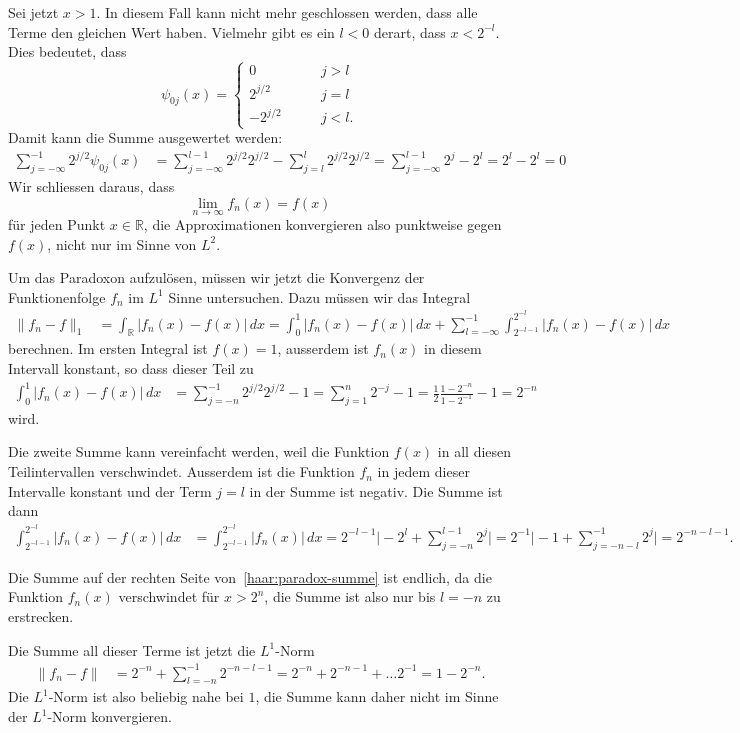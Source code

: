 Sei jetzt $x>1$.
In diesem Fall kann nicht mehr geschlossen werden, dass alle Terme den
gleichen Wert haben.
Vielmehr gibt es ein $l<0$ derart, dass $x < 2^{-l}$.
Dies bedeutet, dass
\[
\psi_{0j}(x)
=
\begin{cases}
0&\qquad j>l\\
2^{j/2}&\qquad j = l
\\
-2^{j/2}&\qquad j < l.
\end{cases}
\]
Damit kann die Summe ausgewertet werden:
\begin{align*}
\sum_{j=-\infty}^{-1} 2^{j/2} \psi_{0j}(x)
&=
\sum_{j=-\infty}^{l-1} 2^{j/2} 2^{j/2}
-
\sum_{j=l}^{l} 2^{j/2} 2^{j/2}
=
\sum_{j=-\infty}^{l-1} 2^j
-
2^l
=
2^l
-
2^l
=
0
\end{align*}
Wir schliessen daraus, dass 
\[
\lim_{n\to\infty} f_n(x) = f(x)
\]
für jeden Punkt $x\in\mathbb R$, die Approximationen konvergieren also
punktweise gegen $f(x)$, nicht nur im Sinne von $L^2$.

Um das Paradoxon aufzulösen, müssen wir jetzt die Konvergenz der
Funktionenfolge $f_n$ im $L^1$ Sinne untersuchen.
Dazu müssen wir das Integral
\begin{align}
\| f_n-f\|_1
&=
\int_{\mathbb R} |f_n(x) - f(x)| \,dx
=
\int_0^1 |f_n(x) - f(x)|\,dx
+
\sum_{l=-\infty}^{-1}
\int_{2^{-l-1}}^{2^{-l}} |f_n(x)-f(x)|\,dx
\label{haar:paradox-summe}
\end{align}
berechnen.
Im ersten Integral ist $f(x)=1$, ausserdem ist $f_n(x)$ in diesem Intervall
konstant, so dass dieser Teil zu
\begin{align*}
\int_0^1 |f_n(x) - f(x)|\,dx
&=
\sum_{j=-n}^{-1} 2^{j/2} 2^{j/2} - 1
=
\sum_{j=1}^{n} 2^{-j} - 1
=
\frac12
\frac{1-2^{-n}}{1-2^{-1}}-1
=
2^{-n}
\end{align*}
wird.

Die zweite Summe kann vereinfacht werden, weil die Funktion $f(x)$ in all
diesen Teilintervallen verschwindet.
Ausserdem ist die Funktion $f_n$ in jedem dieser Intervalle konstant
und der Term $j=l$ in der Summe ist negativ.
Die Summe ist dann
\begin{align*}
\int_{2^{-l-1}}^{2^{-l}} |f_n(x)-f(x)|\,dx
&=
\int_{2^{-l-1}}^{2^{-l}} |f_n(x)|\,dx
=
2^{-l-1} 
\biggl|
-2^{l}
+
\sum_{j=-n}^{l-1}  2^{j}
\biggr|
=
2^{-1} 
\biggl|
-1
+
\sum_{j=-n-l}^{-1}  2^{j}
\biggr|
=
2^{-n-l-1}.
\end{align*}

Die Summe auf der rechten Seite von~\eqref{haar:paradox-summe} ist
endlich, da die Funktion $f_n(x)$ verschwindet für $x>2^n$, die Summe
ist also nur bis $l=-n$ zu erstrecken.

Die Summe all dieser Terme ist jetzt die $L^1$-Norm
\begin{align*}
\|f_n - f\|
&=
2^{-n} + \sum_{l=-n}^{-1} 2^{-n-l-1}
=
2^{-n} + 2^{-n-1} + \dots 2^{-1}
=
1- 2^{-n}.
\end{align*}
Die $L^1$-Norm ist also beliebig nahe bei $1$, die Summe kann daher
nicht im Sinne der $L^1$-Norm konvergieren.

